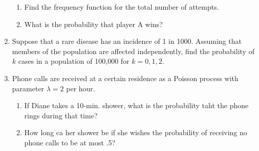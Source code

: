 \documentclass[10pt,a4paper]{report}
\begin{document}
\begin{enumerate}
	\begin{enumerate}
		\item Find the frequency function for the total number of attempts.
		\item What is the probability that player A wins?
	\end{enumerate}
	\setcounter{enumi}{26}
	\item Suppose that a rare disease has an incidence of 1 in 1000.  Assuming that members of the population are affected independently, find the probability of $k$ cases in a population of 100,000 for $k=0,1,2.$
	\setcounter{enumi}{30}
	\item Phone calls are received at a certain residence as a Poisson process with parameter $\lambda=2$ per hour.
	\begin{enumerate}
		\item If Diane takes a 10-min. shower, what is the probability taht the phone rings during that time?
		\item How long ca her shower be if she wishes the probability of receiving no phone calls to be at most .5?
	\end{enumerate}

\end{enumerate}
\end{document}
